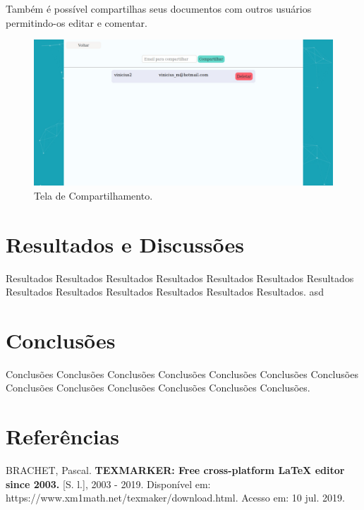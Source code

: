 \documentclass[article,12pt,oneside,a4paper,english,brazil,sumario=tradicional]{abntex2}
\begin{document}
Também é possível compartilhas seus documentos com outros usuários permitindo-os editar e comentar.


  \begin{figure}[H]
    \centering
    \caption{Tela de Compartilhamento.}
    \includegraphics[width=16cm]{figures/Tela Compartilhar Projeto - FATEX.jpeg}
  \end{figure}






\section{Resultados e Discussões}

Resultados Resultados Resultados Resultados Resultados Resultados Resultados Resultados Resultados Resultados Resultados Resultados Resultados. asd





\section{Conclusões}

Conclusões Conclusões Conclusões Conclusões Conclusões Conclusões Conclusões Conclusões Conclusões Conclusões Conclusões Conclusões Conclusões.





\section{Referências}
\raggedright


BRACHET, Pascal. \textbf{TEXMARKER: Free cross-platform LaTeX editor since 2003.} [S. l.], 2003 - 2019. Disponível em: https://www.xm1math.net/texmaker/download.html. Acesso em: 10 jul. 2019.
\end{document}
